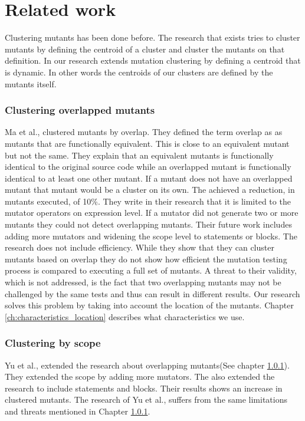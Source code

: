 \documentclass[../main]{subfiles}
\begin{document}
\chapter{Related work}
\label{ch:related_work}
Clustering mutants has been done before.
The research that exists tries to cluster mutants by defining the centroid of a cluster and cluster the mutants on that definition.
In our research extends mutation clustering by defining a centroid that is dynamic.
In other words the centroids of our clusters are defined by the mutants itself.

\subsection{Clustering overlapped mutants}
\label{ch:overlapping_mutants}
Ma et al., clustered mutants by overlap\cite{Ma2016}.
They defined the term overlap as as mutants that are functionally equivalent.
This is close to an equivalent mutant but not the same.
They explain that an equivalent mutants is functionally identical to the original source code while an overlapped mutant is functionally identical to at least one other mutant.
If a mutant does not have an overlapped mutant that mutant would be a cluster on its own.
The achieved a reduction, in mutants executed, of 10\%.
They write in their research that it is limited to the mutator operators on expression level. 
If a mutator did not generate two or more mutants they could not detect overlapping mutants.
Their future work includes adding more mutators and widening the scope level to statements or blocks.
\newline
The research does not include efficiency.
While they show that they can cluster mutants based on overlap they do not show how efficient the mutation testing process is compared to executing a full set of mutants.
A threat to their validity, which is not addressed, is the fact that two overlapping mutants may not be challenged by the same tests and thus can result in different results.
Our research solves this problem by taking into account the location of the mutants.
Chapter \ref{ch:characteristics_location} describes what characteristics we use.

\subsection{Clustering by scope}
Yu et al., extended the research about overlapping mutants(See chapter \ref{ch:overlapping_mutants})\cite{Yu2019PossibilityScope}.
They extended the scope by adding more mutators.
The also extended the research to include statements and blocks.
Their results shows an increase in clustered mutants.
The research of Yu et al., suffers from the same limitations and threats  mentioned in Chapter \ref{ch:overlapping_mutants}.
\end{document}
